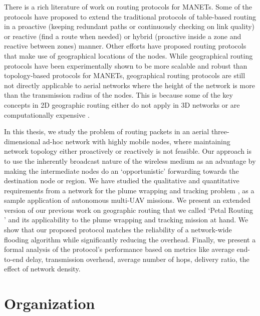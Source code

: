 There is a rich literature of work on routing protocols for MANETs. Some of the protocols have proposed to extend the traditional protocols of table-based routing in a proactive (keeping redundant paths or continuously checking on link quality) or reactive (find a route when needed) or hybrid (proactive inside a zone and reactive between zones) manner. Other efforts have proposed routing protocols that make use of geographical locations of the nodes. While geographical routing protocols have been experimentally shown to be more scalable and robust than topology-based protocols for MANETs, geographical routing protocols are still not directly applicable to aerial networks where the height of the network is more than the transmission radius of the nodes. This is because some of the key concepts in 2D geographic routing either do not apply in 3D networks or are computationally expensive \cite{6238283}.

In this thesis, we study the problem of routing packets in an aerial three-dimensional ad-hoc network with highly mobile nodes, where maintaining network topology either proactively or reactively is not feasible. Our approach is to use the inherently broadcast nature of the wireless medium as an advantage by making the intermediate nodes do an `opportunistic' forwarding towards the destination node or region. We have studied the qualitative and quantitative requirements from a network for the plume wrapping and tracking problem \cite{8080382}, as a sample application of autonomous multi-UAV missions. We present an extended version of our previous work on geographic routing that we called `Petal Routing \cite{6133499}' and its applicability to the plume wrapping and tracking mission at hand. We show that our proposed protocol matches the reliability of a network-wide flooding algorithm while significantly reducing the overhead. Finally, we present a formal analysis of the protocol's performance based on metrics like average end-to-end delay, transmission overhead, average number of hops, delivery ratio, the effect of network density.


\section{Organization} 
